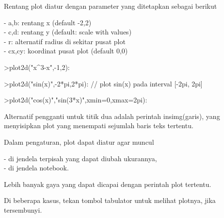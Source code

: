 \documentclass{article}
\begin{document}
\begin{eulernotebook}
\begin{eulercomment}
\begin{eulercomment}
\begin{eulercomment}
\begin{eulercomment}
\begin{eulercomment}
Rentang plot diatur dengan parameter yang ditetapkan sebagai berikut

- a,b: rentang x (default -2,2)\\
- c,d: rentang y (default: scale with values)\\
- r: alternatif radius di sekitar pusat plot\\
- cx,cy: koordinat pusat plot (default 0,0)
\end{eulercomment}
\begin{eulerprompt}
>plot2d("x^3-x",-1,2):
\end{eulerprompt}
\begin{eulerprompt}
>plot2d("sin(x)",-2*pi,2*pi): // plot sin(x) pada interval [-2pi, 2pi]
\end{eulerprompt}
\begin{eulerprompt}
>plot2d("cos(x)","sin(3*x)",xmin=0,xmax=2pi):
\end{eulerprompt}
\begin{eulercomment}
Alternatif pengganti untuk titik dua adalah perintah insimg(garis),
yang menyisipkan plot yang menempati sejumlah baris teks tertentu.

Dalam pengaturan, plot dapat diatur agar muncul

- di jendela terpisah yang dapat diubah ukurannya,\\
- di jendela notebook.

Lebih banyak gaya yang dapat dicapai dengan perintah plot tertentu.

Di beberapa kasus, tekan tombol tabulator untuk melihat plotnya, jika
tersembunyi.


\end{eulercomment}
\end{eulercomment}
\end{eulercomment}
\end{eulercomment}
\end{eulercomment}
\end{eulernotebook}
\end{document}
